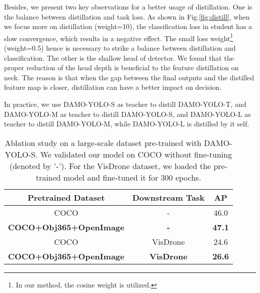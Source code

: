 \documentclass[10pt,twocolumn,letterpaper]{article}
\begin{document}
Besides, we present two key observations for a better usage of distillation. One is the balance between distillation and task loss. As shown in Fig.\ref{fig:distill}, when we focus more on distillation (weight=10), the classification loss in student has a slow convergence, which results in a negative effect. The small loss weight\footnote{In our method, the cosine weight is utilized.} (weight=0.5) hence is necessary to strike a balance between distillation and classification. The other is the shallow head of detector. We found that the proper reduction of the head depth is beneficial to the feature distillation on neck. The reason is that when the gap between the final outputs and the distilled feature map is closer, distillation can have a better impact on decision.

In practice, we use DAMO-YOLO-S as teacher to distill DAMO-YOLO-T, and DAMO-YOLO-M as teacher to distill DAMO-YOLO-S, and DAMO-YOLO-L as teacher to distill DAMO-YOLO-M, while DAMO-YOLO-L is distilled by it self.

\begin{table}
    \begin{center}
    \caption{Ablation study on a large-scale dataset pre-trained with DAMO-YOLO-S. We validated our model on COCO without fine-tuning (denoted by '-'). For the VisDrone dataset, we loaded the pre-trained model and fine-tuned it for 300 epochs.}
    \label{tab:pretrain}
    \setlength{\tabcolsep}{3pt}
    \begin{tabular}{c|c|c}
    \toprule
    Pretrained Dataset & Downstream Task & AP    \\
    \midrule 
    COCO & - & 46.0  \\
    \textbf{COCO+Obj365+OpenImage} & \textbf{-} & \textbf{47.1} \\
    \midrule
    COCO & VisDrone & 24.6 \\
    \textbf{COCO+Obj365+OpenImage}  & \textbf{VisDrone} & \textbf{26.6} \\
    \bottomrule
    \end{tabular}
    \end{center}
\end{table}
\end{document}
